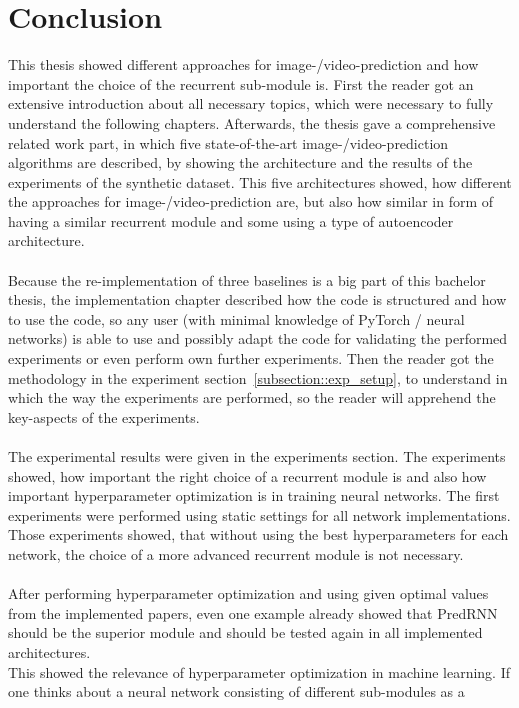 \section{Conclusion} \label{section::conclusion}
 This thesis showed different approaches for image-/video-prediction and how important the choice of the recurrent sub-module is.
 First the reader got an extensive introduction
 about all necessary topics, which were necessary to fully understand the following chapters. Afterwards, the thesis gave a comprehensive related work part, in 
 which five state-of-the-art image-/video-prediction algorithms are described, by showing the architecture and the results of the experiments of the synthetic 
 dataset. This five architectures showed, how different the approaches for image-/video-prediction are, but also how similar in form of
 having a similar recurrent module and some using a type of autoencoder architecture.
 \\\\
 Because the re-implementation
 of three baselines is a big part of this bachelor thesis, the implementation chapter described how the code is structured and how to use the code, so any
 user (with minimal knowledge of PyTorch / neural networks) is able to use and possibly adapt the code for validating the performed experiments or even perform
 own further experiments. Then the reader got the methodology in the experiment section~\ref{subsection::exp_setup}, to understand in which the way the 
 experiments are performed, so the reader will apprehend the key-aspects of the experiments.
 \\\\
 The experimental results were given in the experiments section.
 The experiments showed, how important the right choice of a recurrent module is and also how important hyperparameter optimization is in training neural networks.
 The first experiments were performed using static settings for all network implementations. Those experiments showed, that without using the \glqq best\grqq{} 
 hyperparameters for each network, the choice of a more advanced recurrent module is not necessary.
 \\\\ 
 After performing hyperparameter optimization and using given \glqq optimal\grqq{} values 
 from the implemented papers, even one example already showed that
 PredRNN should be the superior module and should be tested again in all implemented architectures.\\
 This showed the relevance of hyperparameter optimization in machine learning. If one thinks about a neural network consisting of different sub-modules as a
